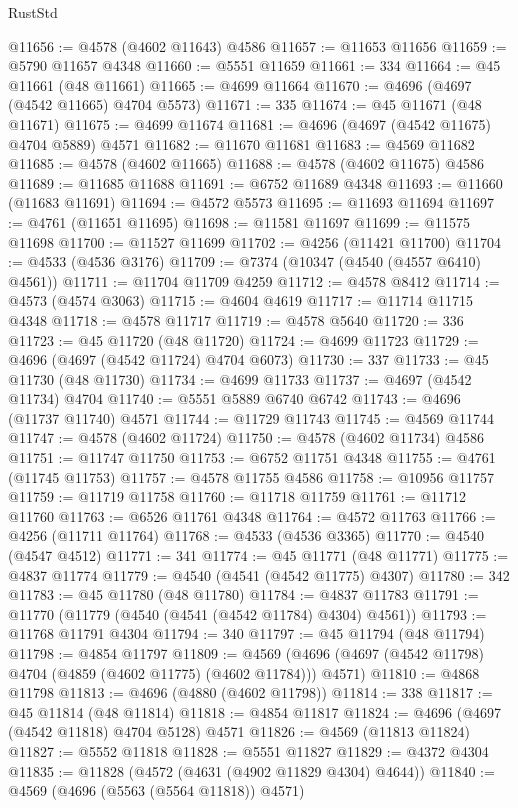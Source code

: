 \begin{lexlean}{RustStd}
\begin{coremodule}
@11656 := @4578 (@4602 @11643) @4586
@11657 := @11653 @11656
@11659 := @5790 @11657 @4348
@11660 := @5551 @11659
@11661 := 334
@11664 := @45 @11661 (@48 @11661)
@11665 := @4699 @11664
@11670 := @4696 (@4697 (@4542 @11665) @4704 @5573)
@11671 := 335
@11674 := @45 @11671 (@48 @11671)
@11675 := @4699 @11674
@11681 := @4696 (@4697 (@4542 @11675) @4704 @5889) @4571
@11682 := @11670 @11681
@11683 := @4569 @11682
@11685 := @4578 (@4602 @11665)
@11688 := @4578 (@4602 @11675) @4586
@11689 := @11685 @11688
@11691 := @6752 @11689 @4348
@11693 := @11660 (@11683 @11691)
@11694 := @4572 @5573
@11695 := @11693 @11694
@11697 := @4761 (@11651 @11695)
@11698 := @11581 @11697
@11699 := @11575 @11698
@11700 := @11527 @11699
@11702 := @4256 (@11421 @11700)
@11704 := @4533 (@4536 @3176)
@11709 := @7374 (@10347 (@4540 (@4557 @6410) @4561))
@11711 := @11704 @11709 @4259
@11712 := @4578 @8412
@11714 := @4573 (@4574 @3063)
@11715 := @4604 @4619
@11717 := @11714 @11715 @4348
@11718 := @4578 @11717
@11719 := @4578 @5640
@11720 := 336
@11723 := @45 @11720 (@48 @11720)
@11724 := @4699 @11723
@11729 := @4696 (@4697 (@4542 @11724) @4704 @6073)
@11730 := 337
@11733 := @45 @11730 (@48 @11730)
@11734 := @4699 @11733
@11737 := @4697 (@4542 @11734) @4704
@11740 := @5551 @5889 @6740 @6742
@11743 := @4696 (@11737 @11740) @4571
@11744 := @11729 @11743
@11745 := @4569 @11744
@11747 := @4578 (@4602 @11724)
@11750 := @4578 (@4602 @11734) @4586
@11751 := @11747 @11750
@11753 := @6752 @11751 @4348
@11755 := @4761 (@11745 @11753)
@11757 := @4578 @11755 @4586
@11758 := @10956 @11757
@11759 := @11719 @11758
@11760 := @11718 @11759
@11761 := @11712 @11760
@11763 := @6526 @11761 @4348
@11764 := @4572 @11763
@11766 := @4256 (@11711 @11764)
@11768 := @4533 (@4536 @3365)
@11770 := @4540 (@4547 @4512)
@11771 := 341
@11774 := @45 @11771 (@48 @11771)
@11775 := @4837 @11774
@11779 := @4540 (@4541 (@4542 @11775) @4307)
@11780 := 342
@11783 := @45 @11780 (@48 @11780)
@11784 := @4837 @11783
@11791 := @11770 (@11779 (@4540 (@4541 (@4542 @11784) @4304) @4561))
@11793 := @11768 @11791 @4304
@11794 := 340
@11797 := @45 @11794 (@48 @11794)
@11798 := @4854 @11797
@11809 := @4569 (@4696 (@4697 (@4542 @11798) @4704 (@4859 (@4602 @11775) (@4602 @11784))) @4571)
@11810 := @4868 @11798
@11813 := @4696 (@4880 (@4602 @11798))
@11814 := 338
@11817 := @45 @11814 (@48 @11814)
@11818 := @4854 @11817
@11824 := @4696 (@4697 (@4542 @11818) @4704 @5128) @4571
@11826 := @4569 (@11813 @11824)
@11827 := @5552 @11818
@11828 := @5551 @11827
@11829 := @4372 @4304
@11835 := @11828 (@4572 (@4631 (@4902 @11829 @4304) @4644))
@11840 := @4569 (@4696 (@5563 (@5564 @11818)) @4571)

\end{coremodule}
\end{lexlean}
